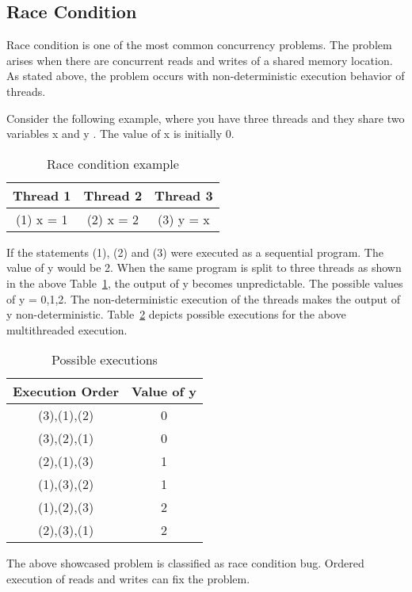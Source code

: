 \subsection{Race Condition}

Race condition is one of the most common concurrency problems.  
The problem arises when there are concurrent reads and writes of a shared memory location. 
As stated above, the problem occurs with non-deterministic execution behavior of threads. 

Consider the following example, where you have three threads and they share two variables x and y \cite{carver2005modern}. 
The value of x is initially 0. 

\begin{table}[h]
\centering
\begin{tabular}{*{3}{c}}
Thread 1 & Thread 2 & Thread 3 \\
\hline
 (1) x = 1 & (2) x = 2 & (3) y = x\\
\end{tabular}
\caption{Race condition example}
\label{race_cond}
\end{table}

If the statements (1), (2) and (3) were executed as a sequential program. 
The value of y would be 2. 
When the same program is split to three threads as shown in the above Table~\ref{race_cond}, the output of y becomes unpredictable. 
The possible values of y = {0,1,2}. 
The non-deterministic execution of the threads makes the output of y non-deterministic. 
Table~\ref{poss_exec} depicts possible executions for the above multithreaded execution. 

\begin{table}[h]
\centering
\begin{tabular}{*{2}{c}}
Execution Order & Value of y \\
\hline
 (3),(1),(2)& 0\\
 (3),(2),(1)& 0\\
 (2),(1),(3)& 1\\
 (1),(3),(2)& 1\\
 (1),(2),(3)& 2\\
 (2),(3),(1)& 2\\
\end{tabular}
\caption{Possible executions}
\label{poss_exec}
\end{table}

The above showcased problem is classified as race condition bug. 
Ordered execution of reads and writes can fix the problem. 

